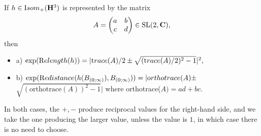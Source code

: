 \begin{lemma}\label{GMT 1.25} If $h \in {\textrm Isom}_+(\mathbf {H}^3)$ is represented by the matrix $$A = \left(\begin{matrix}a &  b \cr c & d\cr\end{matrix}\right)\in \mathrm {SL}(2,\mathbf {C}),$$ then 
\begin{itemize}
\item{a)} $\exp({\textrm Relength} (h))= |{\textrm trace}(A)/2 \pm \sqrt{({\textrm trace}(A)/2)^2 - 1}|^2,$

\item{b)} $\exp({\textrm Redistance} (h(B_{(0;\infty)}), B_{(0;\infty)}))=|{\textrm orthotrace}(A) \pm$\hfill \noindent $\sqrt{(\mathrm {orthotrace}(A))^2 - 1}|$  where 
{\textrm orthotrace(}$A) = ad + bc.$ $\phantom{\sum^\int}$
\end{itemize}
In both cases{\textrm ,} the $+, -$ produce reciprocal values for the right\/{\textrm -}\/hand side{\textrm ,}
  and we take the one producing the larger value{\textrm ,} unless the value is $1${\textrm ,} in
which case there is no need to choose.
\end{lemma}

